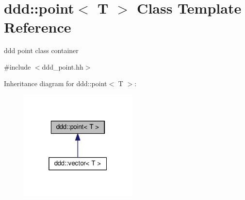 \hypertarget{classddd_1_1point}{}\section{ddd\+:\+:point$<$ T $>$ Class Template Reference}
\label{classddd_1_1point}


ddd point class container  




{\ttfamily \#include $<$ddd\+\_\+point.\+hh$>$}



Inheritance diagram for ddd\+:\+:point$<$ T $>$\+:
\nopagebreak
\begin{figure}[H]
\begin{center}
\leavevmode
\includegraphics[width=169pt]{d1/d9e/classddd_1_1point__inherit__graph}
\end{center}
\end{figure}
